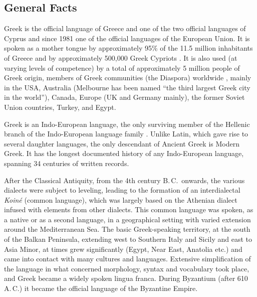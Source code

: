 \clearpage


\begin{multicols}{2}

\subsection{General Facts}

Greek is the official language of Greece and one of the two official languages of Cyprus and since 1981 one of the official languages of the European Union. It is spoken as a mother tongue by approximately 95\% of the 11.5 million inhabitants of Greece and by approximately 500,000 Greek Cypriots \cite{Stat1}. It is also used (at varying levels of competence) by a total of approximately 5 million people of Greek origin, members of Greek communities (the Diaspora) worldwide  \cite{Dias1}, mainly in the USA, Australia (Melbourne has been named “the third largest Greek city in the world”), Canada, Europe (UK and Germany mainly), the former Soviet Union countries, Turkey, and Egypt. 

Greek is an Indo-European language, the only surviving member of the Hellenic branch of the Indo-European language family \cite{Trud1}. Unlike Latin, which gave rise to several daughter languages, the only descendant of Ancient Greek is Modern Greek. It has the longest documented history of any Indo-European language, spanning 34 centuries of written records.

After the Classical Antiquity, from the 4th century B.\,C.~onwards, the various dialects were subject to leveling, leading to the formation of an interdialectal \textit{Koiné} (common language), which was largely based on the Athenian dialect infused with elements from other dialects. This common language was spoken, as a native or as a second language, in a geographical setting with varied extension around the Mediterranean Sea. The basic Greek-speaking territory, at the south of the Balkan Peninsula, extending west to Southern Italy and Sicily and east to Asia Minor, at times grew significantly (Egypt, Near East, Anatolia etc.) and came into contact with many cultures and languages. Extensive simplification of the language in what concerned morphology, syntax and vocabulary took place, and Greek became a widely spoken lingua franca. During Byzantium (after 610 A.\,C.) it became the official language of the Byzantine Empire.


\end{multicols}
